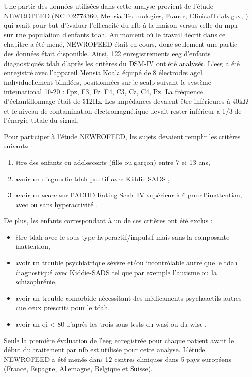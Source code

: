 Une partie des données utilisées dans cette analyse provient de l'étude NEWROFEED (NCT02778360, Mensia Technologies, France, ClinicalTrials.gov, \citet{Bioulac2019})
qui avait pour but d'évaluer l'efficacité du \gls{nfb} à la maison versus celle du \gls{mph} sur une population d'enfants \gls{tdah}.
Au moment où le travail décrit dans ce chapitre a été mené, NEWROFEED était en cours, donc 
seulement une partie des données était disponible. Ainsi, 122 enregistrements \gls{eeg} d'enfants diagnostiqués \gls{tdah} d'après les critères du DSM-IV \citep{DSM-4} 
ont été analysés. L'\gls{eeg} a été enregistré avec l'appareil Mensia Koala équipé de 8 électrodes \gls{agcl} individuellement blindées, positionnées sur le scalp suivant
le système international 10-20 : Fpz, F3, Fz, F4, C3, Cz, C4, Pz. La fréquence d'échantillonnage était de 512Hz. Les impédances devaient être
inférieures à $40\text{k}\Omega$ et le niveau de contamination électromagnétique devait rester inférieur à 1/3 de l'énergie totale du signal. 

Pour participer à l'étude NEWROFEED, les sujets devaient remplir les critères suivants :
\begin{enumerate}
\item être des enfants ou adolescents (fille ou garçon) entre 7 et 13 ans,
\item avoir un diagnostic \gls{tdah} positif avec Kiddie-SADS \citep{Kaufman1997},
\item avoir un score sur l'ADHD Rating Scale IV supérieur à 6 pour l'inattention, avec ou sans hyperactivité \citep{Pappas2006}.
\end{enumerate}

De plus, les enfants correspondant à un de ces critères ont été exclus :
\begin{itemize}
\item être \gls{tdah} avec le sous-type hyperactif/impulsif mais sans la composante inattention,
\item avoir un trouble psychiatrique sévère et/ou incontrôlable autre que le \gls{tdah} diagnostiqué avec Kiddie-SADS tel que par 
exemple l'autisme ou la schizophrénie,
\item avoir un trouble comorbide nécessitant des médicaments psychoactifs autres que ceux prescrits pour le \gls{tdah},
\item avoir un \gls{qi} < 80 d'après les trois sous-tests du \gls{wasi} ou du \gls{wisc} \citep{Wechsler1999}.
\end{itemize}

Seule la première évaluation de l'\gls{eeg} enregistrée pour chaque patient avant le début du traitement par \gls{nfb} est utilisée pour cette analyse. 
L'étude NEWROFEED a été menée dans 12 centres cliniques dans 5 pays européens (France, Espagne, Allemagne, Belgique et Suisse).

